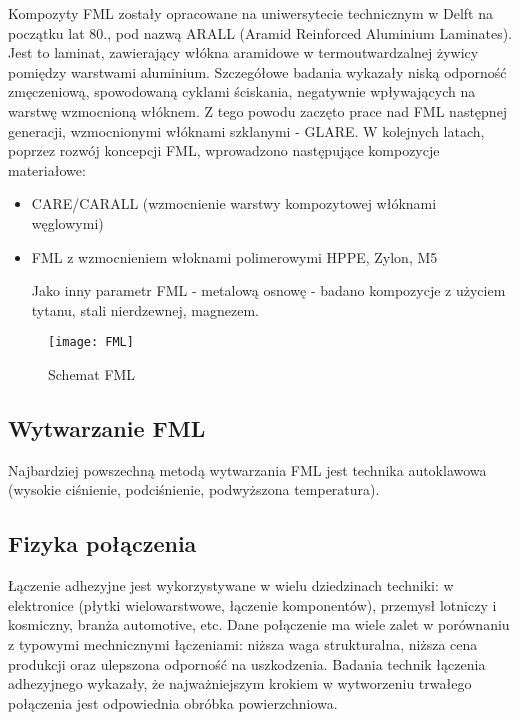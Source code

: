 \documentclass[magister,druk]{dyplom}
\begin{document}
 Kompozyty FML zostały opracowane na uniwersytecie technicznym w Delft na początku lat 80., pod nazwą ARALL (Aramid Reinforced Aluminium Laminates). Jest to laminat, zawierający włókna aramidowe w termoutwardzalnej żywicy pomiędzy warstwami aluminium. Szczegółowe badania wykazały niską odporność zmęczeniową, spowodowaną cyklami ściskania, negatywnie wpływających na warstwę wzmocnioną włóknem. Z tego powodu zaczęto prace nad FML następnej generacji, wzmocnionymi włóknami szklanymi - GLARE. W kolejnych latach, poprzez rozwój koncepcji FML, wprowadzono następujące kompozycje materiałowe:
\begin{itemize}	
	\item CARE/CARALL (wzmocnienie warstwy kompozytowej włóknami węglowymi)
	\item FML z wzmocnieniem włoknami polimerowymi HPPE, Zylon, M5

Jako inny parametr FML - metalową osnowę - badano kompozycje z użyciem tytanu, stali nierdzewnej, magnezem. 
	

\end{itemize}



\begin{figure}[H]
	\texttt{[image: FML]}
	\centering
	\caption{Schemat FML\cite{FMLold}}
\end{figure}

\subsection{Wytwarzanie FML}

Najbardziej powszechną metodą wytwarzania FML jest technika autoklawowa (wysokie ciśnienie, podciśnienie, podwyższona temperatura). 


\subsection{Fizyka połączenia}

Łączenie adhezyjne jest wykorzystywane w wielu dziedzinach techniki: w elektronice (płytki wielowarstwowe, łączenie komponentów), przemysł lotniczy i kosmiczny, branża automotive, etc. Dane połączenie ma wiele zalet w porównaniu z typowymi mechnicznymi łączeniami: niższa waga strukturalna, niższa cena produkcji oraz ulepszona odporność na uszkodzenia. Badania technik łączenia adhezyjnego wykazały, że najważniejszym krokiem w wytworzeniu trwałego połączenia jest odpowiednia obróbka powierzchniowa. 
\end{document}

